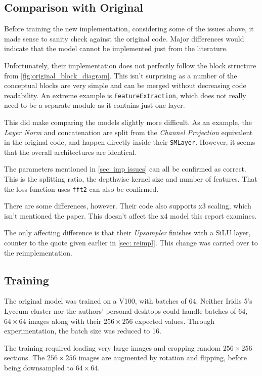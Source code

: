 \documentclass{article}
\begin{document}
    \subsection{Comparison with Original}

    Before training the new implementation, considering some of the issues above, it made sense to sanity check against the original code. Major differences would indicate that the model cannot be implemented just from the literature. 

    Unfortunately, their implementation does not perfectly follow the block structure from \cref{fig:original_block_diagram}. This isn't surprising as a number of the conceptual blocks are very simple and can be merged without decreasing code readability. An extreme example is {\tt FeatureExtraction}, which does not really need to be a separate module as it contains just one layer. 

    This did make comparing the models slightly more difficult. As an example, the {\em Layer Norm} and concatenation are split from the {\em Channel Projection} equivalent in the original code, and happen directly inside their {\tt SMLayer}. However, it seems that the overall architectures are identical.

    The parameters mentioned in \cref{sec: imp issues} can all be confirmed as correct. This is the splitting ratio, the depthwise kernel size and number of features. That the loss function uses {\tt fft2} can also be confirmed.

    There are some differences, however. Their code also supports x3 scaling, which isn't mentioned the paper. This doesn't affect the x4 model this report examines.

    The only affecting difference is that their {\em Upsampler} finishes with a SiLU layer, counter to the quote given earlier in \cref{sec: reimpl}. This change was carried over to the reimplementation.

    \subsection{Training}

     The original model was trained on a V100, with batches of 64. Neither Iridis 5's Lyceum cluster nor the authors' personal desktops could handle batches of 64, $64 \times 64$ images along with their $256 \times 256$ expected values. Through experimentation, the batch size was reduced to 16.

    The training required loading very large images and cropping random $256 \times 256$ sections. The $256 \times 256$ images are augmented by rotation and flipping, before being downsampled to $64 \times 64$. 
    
\end{document}
